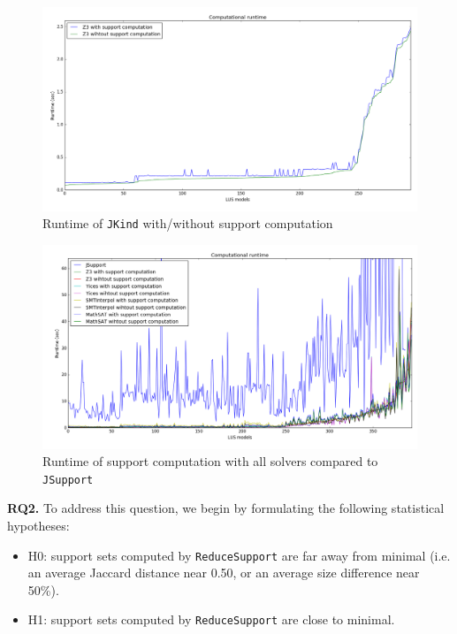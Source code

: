 \begin{figure}
  \centering
  \includegraphics[width=\columnwidth]{figs/runtimeZ3.png}
  \caption{Runtime of \texttt{JKind} with/without support computation}\label{fig:runtimez3}
\end{figure}


\begin{figure}
  \centering
  \includegraphics[width=\columnwidth]{figs/runtimeAll.png}
  \caption{Runtime of support computation with all solvers compared to \texttt{JSupport}}\label{fig:runtimeall}
\end{figure}
\noindent{}
 \vspace{9pt} 

\textbf{RQ2.} To address this question, we begin by formulating the following statistical hypotheses:

\begin{itemize}
  \item H0: support sets computed by \texttt{ReduceSupport} are far away from minimal (i.e. an average Jaccard distance near 0.50, or an average size difference near 50\%).
  \item H1: support sets computed by \texttt{ReduceSupport} are close to minimal.
\end{itemize}

